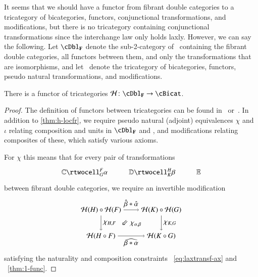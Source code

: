 \documentclass{amsart}
\begin{document}
It seems that we should have a functor from fibrant double categories
to a tricategory of bicategories, functors, conjunctional
transformations, and modifications, but there is no tricategory
containing conjunctional transformations since the interchange law
only holds laxly.  However, we can say the following.  Let $\cDbl_{\bf F}$
denote the sub-2-category of \cDbl\ containing the fibrant double
categories, all functors between them, and only the transformations
that are isomorphisms, and let \cBicat\ denote the tricategory of
bicategories, functors, pseudo natural transformations, and
modifications.

\begin{thm}\label{thm:h-functor}
  There is a functor of tricategories $\cH\maps \cDbl_{\bf F}\to \cBicat$.
\end{thm}
\begin{proof}
  The definition of functors between tricategories can be found
  in~\cite{gps:tricats} or~\cite{nick:tricats}.  In addition to
  \autoref{thm:h-locfr}, we require pseudo natural (adjoint)
  equivalences $\chi$ and $\iota$ relating composition and units in
  $\cDbl_{\bf F}$ and \cBicat, and modifications relating composites of
  these, which satisfy various axioms.  %

For $\chi$ this means that for every pair of transformations
  \[\vcenter{\xymatrix{\lC \rtwocell^F_G{\al} & \lD \rtwocell^H_K{\be}
      & \lE}}\]
  between fibrant double categories, we require an invertible
  modification
\begin{equation}
\begin{tikzpicture}[xscale=0.75, yscale=1.3]
\node (tl) at (0,2) {${\cH}(H) \circ {\cH}(F)$};
\node (bl) at (0,1) {${\cH}(H \circ F)$};
\node (tr) at (4,2) {${\cH}(K) \circ {\cH}(G)$};
\node (br) at (4,1) {${\cH}(K \circ G)$};
\draw[->] (tl) to node [above] {$\hat{\beta} * \hat{\alpha}$} (tr);
\draw[->] (tr) to node [right] {$\chi_{K,G}$} (br);
\draw[->] (tl) to node [right] {$\chi_{H,F}$} (bl);
\draw[->] (bl) to node [below] {$\widehat{\be*\al}$} (br);
\node at (2,1.5) {$\Arrow{5} \chi_{\alpha,\beta} $};
\end{tikzpicture}
\end{equation}
satisfying the naturality and composition constraints ~\ref{eq:laxtransf-ax} and ~\ref{thm:1-func}.


\end{proof}
\end{document}
